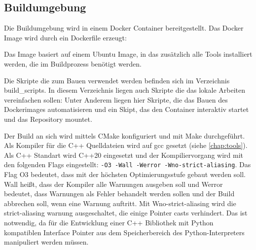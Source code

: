 

\subsection{Buildumgebung}
Die Buildumgebung wird in einem Docker Container bereitgestellt. Das Docker Image wird durch ein Dockerfile erzeugt:



Das Image basiert auf einem Ubuntu Image, in das zusätzlich alle Tools installiert werden, die im Buildprozess benötigt werden.

Die Skripte die zum Bauen verwendet werden befinden sich im Verzeichnis \glqq build\_scripts\grqq{}. In diesem Verzeichnis liegen auch Skripte die das lokale Arbeiten vereinfachen sollen: Unter Anderem liegen hier Skripte, die das Bauen des Dockerimages automatisieren und ein Skipt, das den Container interaktiv startet und das Repository mountet.

Der Build an sich wird mittels CMake konfiguriert und mit Make durchgeführt. Als Kompiler für die C++ Quelldateien wird auf gcc gesetzt (siehe \autoref{chap:tools}). Als C++ Standart wird C++20 eingesetzt und der Kompiliervorgang wird mit den folgenden Flags eingestellt: \lstinline{-O3 -Wall -Werror -Wno-strict-aliasing}. Das Flag O3 bedeutet, dass mit der höchsten Optimierungsstufe gebaut werden soll. Wall heißt, dass der Kompiler alle Warnungen ausgeben soll und Werror bedeutet, dass Warnungen als Fehler behandelt werden sollen und der Build abbrechen soll, wenn eine Warnung auftritt. Mit Wno-strict-aliasing wird die strict-aliasing warnung ausgeschaltet, die einige Pointer casts verhindert. Das ist notwendig, da für die Entwicklung einer C++ Bibliothek mit Python kompatiblen Interface Pointer aus dem Speicherbereich des Python-Interpreters manipuliert werden müssen.
